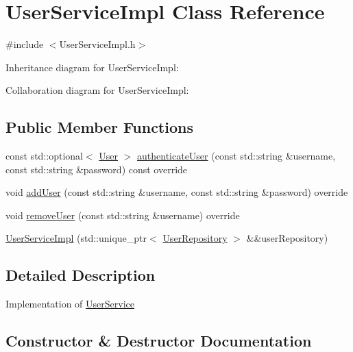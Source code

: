 \hypertarget{classUserServiceImpl}{}\section{User\+Service\+Impl Class Reference}
\label{classUserServiceImpl}


{\ttfamily \#include $<$User\+Service\+Impl.\+h$>$}



Inheritance diagram for User\+Service\+Impl\+:


Collaboration diagram for User\+Service\+Impl\+:
\subsection*{Public Member Functions}
\begin{DoxyCompactItemize}
\item 
const std\+::optional$<$ \hyperlink{classUser}{User} $>$ \hyperlink{classUserServiceImpl_a6ea0a8f645f2be10ca7d48ca232fe70a}{authenticate\+User} (const std\+::string \&username, const std\+::string \&password) const override
\item 
void \hyperlink{classUserServiceImpl_adf6e4832c7da54d3894f3eb554a8ffe1}{add\+User} (const std\+::string \&username, const std\+::string \&password) override
\item 
void \hyperlink{classUserServiceImpl_a3549c348a3c24d4b0519339c0123460d}{remove\+User} (const std\+::string \&username) override
\item 
\hyperlink{classUserServiceImpl_a20e761b7696d6d237b23819c9a1d2b41}{User\+Service\+Impl} (std\+::unique\+\_\+ptr$<$ \hyperlink{classUserRepository}{User\+Repository} $>$ \&\&user\+Repository)
\end{DoxyCompactItemize}


\subsection{Detailed Description}
Implementation of \hyperlink{classUserService}{User\+Service} 

\subsection{Constructor \& Destructor Documentation}
\mbox{\label{classUserServiceImpl_a20e761b7696d6d237b23819c9a1d2b41}} 
